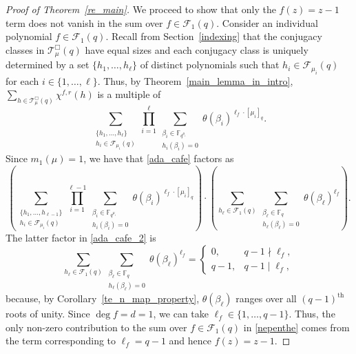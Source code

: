 \documentclass[Unicode,ALCO]{cedram}
\newcommand{\F}{\mathbb{F}}
\newcommand{\CF}{\mathcal{F}}
\newcommand{\CT}{\mathcal{T}}
\newcommand{\te}{\theta}
\begin{document}
\begin{proof}[Proof of Theorem~\ref{re_main}]
We proceed to show that only the \(f(z) = z-1\) term does not vanish in the sum over \(f \in \CF_1(q)\).
Consider an individual polynomial \(f \in \CF_1 (q)\).
Recall from Section~\ref{indexing} that the conjugacy classes in \(\CT_\mu^\Box (q)\) have equal sizes and each conjugacy class is uniquely determined by a set \(\{h_1,\ldots,h_\ell\}\) of distinct polynomials such that \(h_i \in \CF_{\mu_i} (q)\) for each \(i \in \{1,\ldots,\ell\}\).
Thus,
by Theorem~\ref{main_lemma_in_intro},
\(\sum_{h \in \CT_\mu^\Box (q)} \chi^{f,r} (h)\) is a multiple of
\begin{equation}
\label{ada_cafe}
\sum_{\substack{\{h_1,\ldots,h_\ell\} \\ h_i \in \CF_{\mu_i} (q)}}
\prod_{i=1}^\ell
\sum_{\substack{\beta_i \in \F_{q^{\mu_i}} \\ h_i(\beta_i) = 0}} \te(\beta_i)^{\ell_f \cdot [\mu_i]_q}.
\end{equation}
Since \(m_1(\mu) = 1\), we have that \eqref{ada_cafe} factors as
\begin{equation}
\label{ada_cafe_2}
\left (
\sum_{\substack{\{h_1,\ldots,h_{\ell-1}\} \\ h_i \in \CF_{\mu_i} (q)}}
\prod_{i=1}^{\ell-1}
\sum_{\substack{\beta_i \in \F_{q^{\mu_i}} \\ h_i(\beta_i) = 0}} \te(\beta_i)^{\ell_f \cdot [\mu_i]_q}
\right )
\cdot
\left (
\sum_{h_\ell \in \CF_{1} (q)}
\sum_{\substack{\beta_\ell \in \F_{q} \\ h_\ell(\beta_\ell) = 0}} \te(\beta_\ell)^{\ell_f}
\right ).
\end{equation}
The latter factor in \eqref{ada_cafe_2} is
\[
\sum_{h_\ell \in \CF_1 (q)} \sum_{\substack{\beta_\ell \in \F_q \\ h_\ell(\beta_\ell) = 0}} \te(\beta_\ell)^{\ell_f}
=
\begin{cases}
0, & q-1 \nmid \ell_f, \\
q-1, & q-1 \mid \ell_f,
\end{cases}
\]
because, by Corollary~\ref{te_n_map_property}, \(\te(\beta_\ell)\) ranges over all \((q-1)^\text{th}\) roots of unity.
Since \(\deg f = d = 1\), we can take \(\ell_f \in \{1,\ldots,q-1\}\).
Thus, the only non-zero contribution to the sum over \(f \in \CF_1(q)\) in \eqref{nepenthe} comes from the term corresponding to \(\ell_f = q-1\) and hence \(f(z) = z-1\).


\end{proof}
\end{document}

